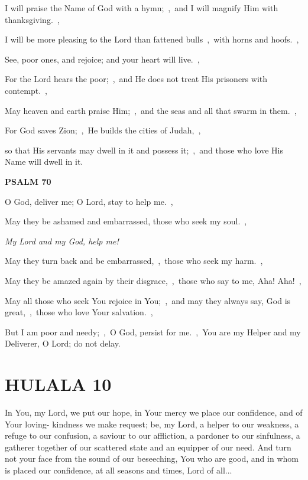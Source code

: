 \documentclass[12pt,twoside,a5paper]{article}
\newcommand{\hulala}[1]{\section*{HULALA {#1}}}
\newcommand{\psalm}[1]{\textbf{PSALM {#1}}\nopagebreak}
\newcommand{\qanona}[1]{{\liturgicalhint{Qanona.} \emph{#1}}}
\newcommand{\slota}[1]{\liturgicalhint{Slota.} #1}
\begin{document}
\begin{normalparskip}
  I will praise the Name of God with a hymn;~\sep\ and I will magnify Him with thanksgiving.~\sep

  I will be more pleasing to the Lord than fattened bulls~\sep\ with horns and hoofs.~\sep

  See, poor ones, and rejoice; and your heart will live.~\sep

  For the Lord hears the poor;~\sep\ and He does not treat His prisoners with contempt.~\sep

  May heaven and earth praise Him;~\sep\ and the seas and all that swarm in them.~\sep

  For God saves Zion;~\sep\ He builds the cities of Judah,~\sep

  so that His servants may dwell in it and possess it;~\sep\ and those who love His Name will dwell in it.
\end{normalparskip}

\psalm{70}

\begin{normalparskip}
  O God, deliver me; O Lord, stay to help me.~\sep

  May they be ashamed and embarrassed, those who seek my soul.~\sep

  \qanona{My Lord and my God, help me!}

  May they turn back and be embarrassed,~\sep\ those who seek my harm.~\sep

  May they be amazed again by their disgrace,~\sep\ those who say to me, Aha! Aha!~\sep

  May all those who seek You rejoice in You;~\sep\ and may they always say, God is great,~\sep\ those who love Your salvation.~\sep

  But I am poor and needy;~\sep\ O God, persist for me.~\sep\ You are my Helper and my Deliverer, O Lord; do not delay.
\end{normalparskip}


\hulala{10}

\slota{In You, my Lord, we put our hope, in Your mercy we place our confidence, and of Your loving- kindness we make request; be, my Lord, a helper to our weakness, a refuge to our confusion, a saviour to our affliction, a pardoner to our sinfulness, a gatherer together of our scattered state and an equipper of our need. And turn not your face from the sound of our beseeching, You who are good, and in whom is placed our confidence, at all seasons and times, Lord of all...}
\end{document}
